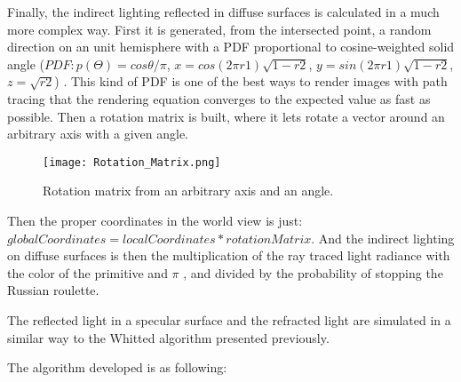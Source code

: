 \par
Finally, the indirect lighting reflected in diffuse surfaces is calculated in a much more complex way.
First it is generated, from the intersected point, a random direction on an unit hemisphere with a PDF proportional to cosine-weighted solid angle
($PDF: p(\Theta) = cos\theta / \pi$,
$x = cos(2\pi r1)\sqrt{1-r2}$,
$y = sin(2\pi r1)\sqrt{1-r2}$,
$z = \sqrt{r2}$)
.
This kind of PDF is one of the best ways to render images with path tracing that the rendering equation converges to the expected value as fast as possible.
Then a rotation matrix is built, where it lets rotate a vector around an arbitrary axis with a given angle.

\begin{figure}[H]
	\centering
	\caption{Rotation matrix from an arbitrary axis and an angle.}
	\label{Rotation_matrix.}
	\texttt{[image: Rotation\_Matrix.png]}
\end{figure}

Then the proper coordinates in the world view is just: $globalCoordinates = localCoordinates * rotationMatrix$.
And the indirect lighting on diffuse surfaces is then the multiplication of the ray traced light radiance with the color of the primitive and
$\pi$
, and divided by the probability of stopping the Russian roulette.

\par
The reflected light in a specular surface and the refracted light are simulated in a similar way to the Whitted algorithm presented previously.

\par
The algorithm developed is as following:

